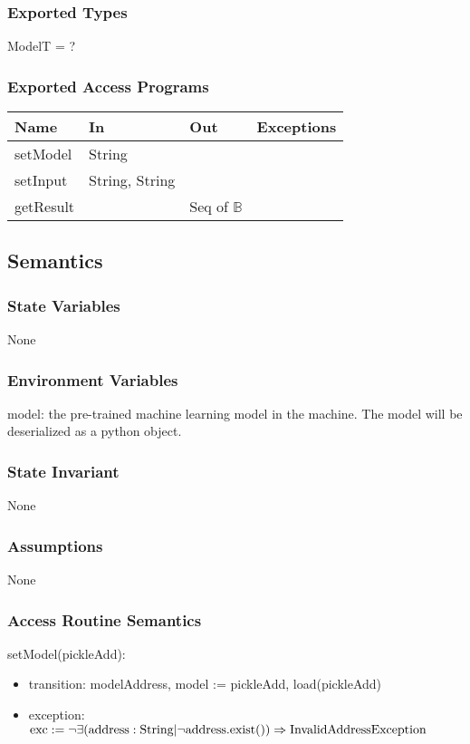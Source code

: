 \documentclass[12pt, titlepage]{article}
\begin{document}
\subsubsection{Exported Types}
ModelT = ?

\subsubsection{Exported Access Programs}

\begin{tabular}{l l l l}
\hline
\textbf{Name} & \textbf{In} & \textbf{Out} & \textbf{Exceptions} \\
\hline
setModel & String & ~ & ~\\
setInput & String, String & ~ & ~ \\
getResult & ~ & Seq of $\mathbb{B}$ & ~ \\
\hline
\end{tabular}

\subsection{Semantics}

\subsubsection{State Variables}
None

\subsubsection{Environment Variables}
model: the pre-trained machine learning model in the machine. The model will be
deserialized as a python object.

\subsubsection{State Invariant}
None

\subsubsection{Assumptions}
None

\subsubsection{Access Routine Semantics}

\noindent setModel(pickleAdd):
\begin{itemize}
\item transition: modelAddress, model := pickleAdd, load(pickleAdd)
\item exception:  $\text{exc} := \neg \exists (\text{address} : \text{String} |
\neg \text{address}.\text{exist}()) \Rightarrow \\
\text{InvalidAddressException}$
\end{itemize}
\end{document}
